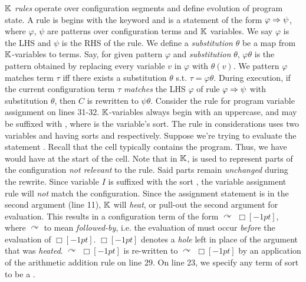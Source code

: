 $\mathbb{K}$ \emph{rules} operate over configuration segments and define evolution of
program state. A rule is begins with the keyword 
and is a statement of the form $\varphi \Rightarrow \psi$, where
$\varphi$, $\psi$ are patterns over configuration terms and $\mathbb{K}$ variables.
We say $\varphi$ is the LHS and $\psi$ is the RHS of the rule.
We define a \emph{substitution} $\theta$ be a map from $\mathbb{K}$-variables to terms.
Say, for given pattern $\varphi$ and \emph{substitution} $\theta$,
$\varphi\theta$ is the pattern obtained by replacing every variable $v$ in
$\varphi$ with $\theta(v)$. We pattern $\varphi$ matches
term $\tau$ iff there exists a substitution $\theta$ s.t. $\tau = \varphi\theta$.
During execution, if the current configuration term
$\tau$ \emph{matches} the LHS $\varphi$ of rule $\varphi \Rightarrow \psi$
with substitution $\theta$, then $C$ is rewritten to $\psi\theta$.
Consider the rule for program variable assignment on lines 31-32.
$\mathbb{K}$-variables always begin with an uppercase, and may be suffixed with
, where  is the variable's sort.
The rule in considerations uses two variables  and 
having sorts  and  respectively. Suppose
we're trying to evaluate the statement .
Recall that the  cell typically contains
the program. Thus, we have would have  at the start
of the cell. Note that in $\mathbb{K}$,  is used to represent
parts of the configuration \emph{not relevant} to the rule. Said parts remain
\emph{unchanged} during the rewrite. Since variable $I$ is suffixed with the sort
, the variable assignment rule will \emph{not} match the
configuration. Since the assignment statement is  in
the second argument (line 11), $\mathbb{K}$ will \emph{heat}, or pull-out the second
argument for evaluation. This results in a configuration term of the form
 $\curvearrowright$ $ \Box[-1pt]$, where  $\curvearrowright$ to mean \emph{followed-by}, i.e.
the evaluation of  must occur \emph{before} the evaluation
of $\Box[-1pt]$\inlinek{;}. $\Box[-1pt]$
denotes a \emph{hole} left in place of the argument that was \emph{heated}.
 $\curvearrowright$  $\Box[-1pt]$ is re-written to  $\curvearrowright$ $
\Box[-1pt]$ by an application of the arithmetic addition rule on line 29. On
line 23, we specify any term of sort  to be a .
